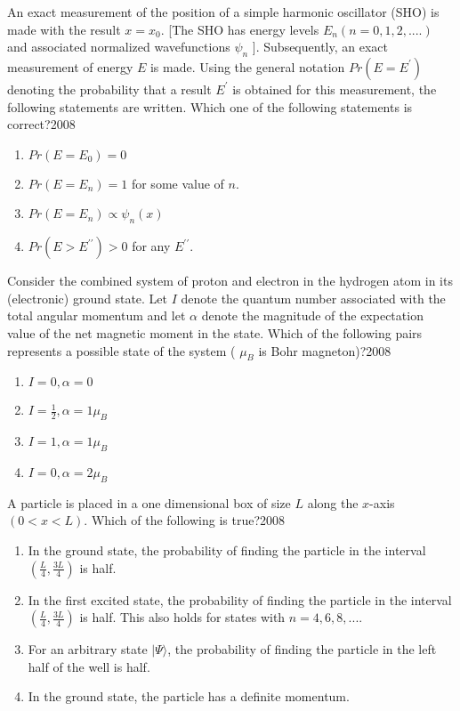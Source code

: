     \item An exact measurement of the position of a simple harmonic oscillator (SHO) is made with the result $x=x_{0}$. [The SHO has energy levels $E_{n}(n=0,1,2, ....)$ and associated normalized wavefunctions $\psi_{n}$ ]. Subsequently, an exact measurement of energy $E$ is made. Using the general notation ${Pr}\left(E=E^{\prime}\right)$ denoting the probability that a result $E^{\prime}$ is obtained for this measurement, the following statements are written. Which one of the following statements is correct?\hfill{2008}
		\begin{multicols}{1}
			\begin{enumerate}
				
	\item ${Pr}\left(E=E_{0}\right)=0$
\item ${Pr}\left(E=E_{n}\right)=1$ for some value of $n$.
\item ${Pr}\left(E=E_{n}\right) \propto \psi_{{n}}(x)$
\item ${Pr}\left(E>E^{\prime \prime}\right)>0$ for any $E^{\prime \prime}$.
			\end{enumerate}
		\end{multicols}

    \item Consider the combined system of proton and electron in the hydrogen atom in its (electronic) ground state. Let $I$ denote the quantum number associated with the total angular momentum and let $\alpha$ denote the magnitude of the expectation value of the net magnetic moment in the state. Which of the following pairs represents a possible state of the system ( $\mu_B$ is Bohr magneton)?\hfill{2008}
    \begin{multicols}{4}
            \begin{enumerate}
        \item $I=0,\alpha =0$
        \item $I=\frac{1}{2},\alpha =1\mu_B$
        \item $I=1,\alpha =1 \mu_B$
        \item $I=0,\alpha=2\mu_B$
        \end{enumerate}
        \end{multicols}
    \item A particle is placed in a one dimensional box of size $L$ along the $x$-axis $(0<x<L)$. Which of the following is true?\hfill{2008}
    
            \begin{enumerate}
             \item In the ground state, the probability of finding the particle in the interval $(\frac{L}{4},\frac{3 L}{4})$ is half.
\item In the first excited state, the probability of finding the particle in the interval $(\frac{L}{4},\frac{3 L}{4})$ is half. This also holds for states with $n=4,6,8, ....$
\item For an arbitrary state $|\Psi\rangle$, the probability of finding the particle in the left half of the well is half.
\item In the ground state, the particle has a definite momentum. 
              \end{enumerate}
        
